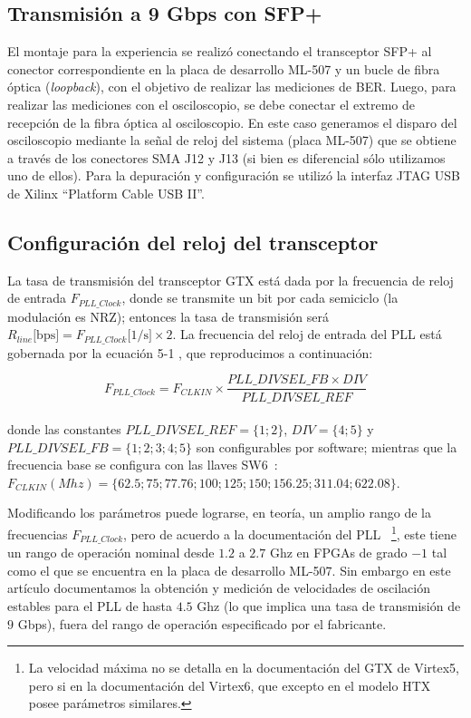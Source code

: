 \subsection{Transmisión a 9 Gbps con SFP+}
El montaje para la experiencia se realizó conectando el transceptor SFP+
al conector correspondiente en la placa de desarrollo ML-507 y un bucle de
fibra óptica ({\em loopback}), con el objetivo de realizar las
mediciones de BER. Luego, para realizar las mediciones con el
osciloscopio, se debe conectar el extremo de recepción de la fibra
óptica al osciloscopio. En este caso generamos el disparo del
osciloscopio mediante la señal de reloj del sistema (placa ML-507) que
se obtiene a través de los conectores SMA J12 y J13 (si bien es
diferencial sólo utilizamos uno de ellos).  Para la depuración y
configuración se utilizó la interfaz JTAG USB de Xilinx ``Platform Cable
USB II''.
\subsection{Configuración del reloj del transceptor}

La tasa de transmisión del transceptor GTX está dada por la
frecuencia de reloj de entrada $F_{PLL\_Clock}$, donde se transmite un
bit por cada semiciclo (la modulación es NRZ); entonces la tasa de
transmisión será
$R_{line}\mbox{[bps]}=F_{PLL\_Clock}\mbox{[1/s]} \times 2$.  La
frecuencia del reloj de entrada del PLL está gobernada por la ecuación
5-1 \cite[Pag. 88]{ug198}, que reproducimos a continuación:

\begin{equation}
F_{PLL\_Clock} = F_{CLKIN} \times \frac{PLL\_DIVSEL\_FB \times
DIV}{PLL\_DIVSEL\_REF}%
\end{equation}\\

donde las constantes $PLL\_DIVSEL\_REF = \{1;2\}$, $DIV = \{4;5\} $ y
$PLL\_DIVSEL\_FB = \{1;2;3;4;5\}$ son configurables por software;
mientras que la frecuencia base se configura con las llaves
SW6~\cite[Tabla 1-32]{ug347}: $
F_{CLKIN} (Mhz)= \{62.5;75;77.76;100;125;150;156.25;311.04;622.08\}$.


 Modificando los parámetros puede lograrse, en teoría, un amplio rango
de la frecuencias $F_{PLL\_Clock}$, pero de acuerdo a la documentación
del PLL \cite[Pág. 71]{ug366}~\footnote{La velocidad máxima no se
detalla en la documentación del GTX de Virtex5, pero si en la
documentación del Virtex6, que excepto en el modelo HTX posee parámetros
similares.}, este tiene un rango de operación nominal desde $1.2$ a
$2.7$ Ghz en FPGAs de grado $-1$ tal como el que se encuentra en la
placa de desarrollo ML-507. Sin embargo en este artículo documentamos la
obtención y medición de velocidades de oscilación estables para el PLL
de hasta $4.5$ Ghz (lo que implica una tasa de transmisión de $9$ Gbps),
fuera del rango de operación especificado por el fabricante.

